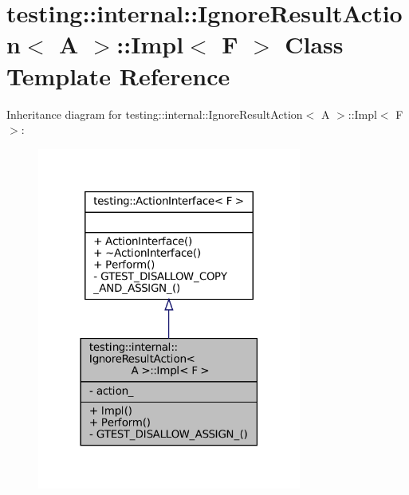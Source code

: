 \hypertarget{classtesting_1_1internal_1_1IgnoreResultAction_1_1Impl}{}\section{testing\+:\+:internal\+:\+:Ignore\+Result\+Action$<$ A $>$\+:\+:Impl$<$ F $>$ Class Template Reference}
\label{classtesting_1_1internal_1_1IgnoreResultAction_1_1Impl}


Inheritance diagram for testing\+:\+:internal\+:\+:Ignore\+Result\+Action$<$ A $>$\+:\+:Impl$<$ F $>$\+:
\nopagebreak
\begin{figure}[H]
\begin{center}
\leavevmode
\includegraphics[width=246pt]{classtesting_1_1internal_1_1IgnoreResultAction_1_1Impl__inherit__graph}
\end{center}
\end{figure}


